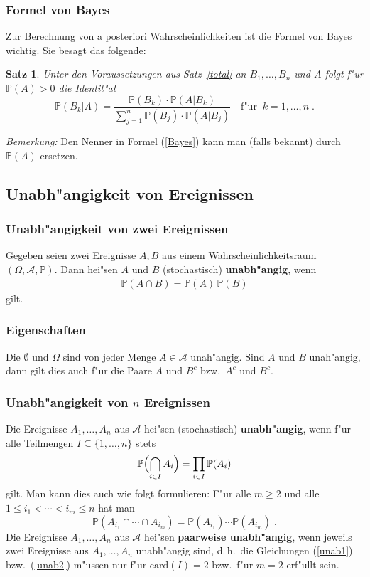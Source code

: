 \documentclass[ngerman,draft,parskip=half,twoside]{scrartcl}
\newtheorem{thm}{Satz}[section]
\newcommand*{\Algeb}{\mathcal{A}}   %
\newcommand*{\WKM}{\mathbb{P}}      %
\begin{document}
\subsubsection{Formel von Bayes}
Zur Berechnung von a posteriori Wahrscheinlichkeiten ist die Formel von
Bayes wichtig. Sie besagt das folgende:
\begin{thm}
Unter den Voraussetzungen aus Satz~\ref{total} an $B_1,\ldots,B_n$ und $A$ folgt
f"ur
$\WKM(A)>0$ die Identit"at
\begin{equation}
\label{Bayes}
\WKM(B_k|A)=\frac{\WKM(B_k)\cdot\WKM(A|B_k)}{\sum_{j=1}^n
\WKM(B_j)\cdot\WKM(A|B_j)}\quad\mbox{f"ur}\;\;k=1,\ldots,n\;.
\end{equation}
\end{thm}
\textit{Bemerkung:} Den Nenner in Formel (\ref{Bayes}) kann man (falls bekannt) durch $\WKM(A)$
ersetzen.
\subsection{Unabh"angigkeit von Ereignissen}
\subsubsection{Unabh"angigkeit von zwei Ereignissen}
Gegeben seien zwei Ereignisse $A,B$ aus einem Wahrscheinlichkeitsraum $(\Omega,\Algeb,\WKM)$.
Dann hei"sen $A$ und $B$ (stochastisch) \textbf{unabh"angig}, wenn
\begin{gather*}
  \WKM(A\cap B)=\WKM(A)\,\WKM(B)
\end{gather*}
gilt.
\subsubsection{Eigenschaften}
Die $\emptyset$ und $\Omega$ sind von jeder Menge $A\in\Algeb$ unah"angig. Sind
$A$ und $B$ unah"angig, dann gilt dies auch f"ur die Paare $A$ und $B^c$ bzw.~$A^c$ und $B^c$.
\subsubsection{Unabh"angigkeit von $n$ Ereignissen}
Die Ereignisse $A_1,\ldots,A_n$ aus $\Algeb$ hei"sen (stochastisch) \textbf{unabh"angig},
wenn f"ur alle Teilmengen $I\subseteq\{1,\ldots,n\}$ stets
\begin{equation}
\label{unab1}
\WKM\Bigl(\bigcap_{i\in I} A_i\Bigr)= \prod_{i\in I}\WKM(A_i)
\end{equation}
gilt. Man kann dies auch wie folgt formulieren: F"ur alle $m\ge 2$ und alle
$1\le i_1<\cdots<i_m\le n$ hat man
\begin{equation}
\label{unab2}
\WKM(A_{i_1}\cap\cdots\cap A_{i_m})= \WKM(A_{i_1})\cdots\WKM(A_{i_m})\;.
\end{equation}
Die Ereignisse $A_1,\ldots,A_n$ aus $\Algeb$ hei"sen \textbf{paarweise unabh"angig}, wenn
jeweils zwei Ereignisse aus $A_1,\ldots,A_n$ unabh"angig sind, d.\,h.~die Gleichungen
(\ref{unab1}) bzw.~(\ref{unab2}) m"ussen nur f"ur $\mathrm{card}(I)=2$ bzw.~f"ur $m=2$ erf"ullt sein.
\end{document}
